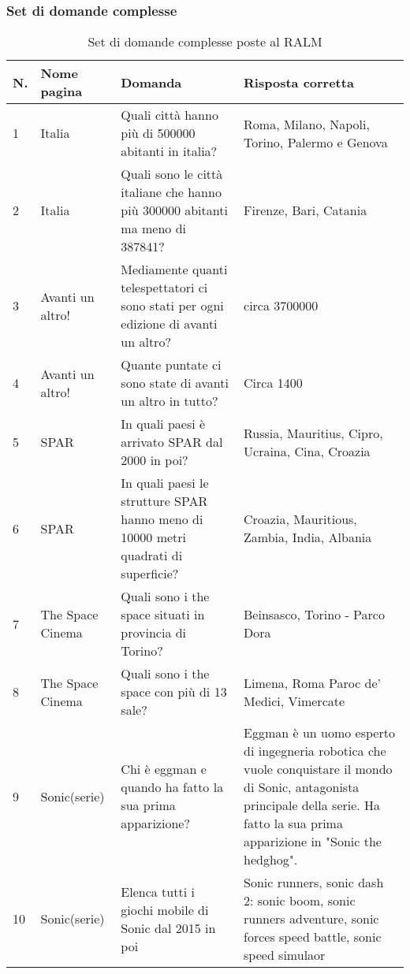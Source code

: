 \subsubsection{Set di domande complesse}
\begin{table}[H]
    \centering
    \begin{tabular}{|p{0.5cm} |p{2.5cm} |p{4cm}| p{4.5cm}|}
        \hline
        \textbf{N}. & \textbf{Nome pagina} & \textbf{Domanda} & \textbf{Risposta corretta} \\
        \hline
        1 & Italia & Quali città hanno più di 500000 abitanti in italia? & Roma, Milano, Napoli, Torino, Palermo e Genova \\
        \hline
        2 & Italia & Quali sono le città italiane che hanno più 300000 abitanti ma meno di 387841? & Firenze, Bari, Catania \\
        \hline
        3 & Avanti un altro! & Mediamente quanti telespettatori ci sono stati per ogni edizione di avanti un altro? & circa 3700000 \\
        \hline
        4 & Avanti un altro! & Quante puntate ci sono state di avanti un altro in tutto? & Circa 1400 \\
        \hline
        5 & SPAR & In quali paesi è arrivato SPAR dal 2000 in poi? & Russia, Mauritius, Cipro, Ucraina, Cina, Croazia \\
        \hline
        6 & SPAR & In quali paesi le strutture SPAR hanno meno di 10000 metri quadrati di superficie? & Croazia, Mauritious, Zambia,  India, Albania \\
        \hline
        7 & The Space Cinema & Quali sono i the space situati in provincia di Torino? & Beinsasco, Torino - Parco Dora \\
        \hline
        8 & The Space Cinema & Quali sono i the space con più di 13 sale? & Limena, Roma Paroc de' Medici,  Vimercate \\
        \hline
        9 & Sonic(serie) & Chi è eggman e quando ha fatto la sua prima apparizione? & Eggman è un uomo esperto di ingegneria robotica che vuole conquistare il mondo di Sonic, antagonista principale della serie. Ha fatto la sua prima apparizione in "Sonic the hedghog". \\
        \hline
        10 & Sonic(serie) & Elenca tutti i giochi mobile di Sonic dal 2015 in poi & Sonic runners, sonic dash 2: sonic boom, sonic runners adventure, sonic forces speed battle, sonic speed simulaor \\
        \hline
    \end{tabular}
    \caption{Set di domande complesse poste al RALM}
\end{table}

